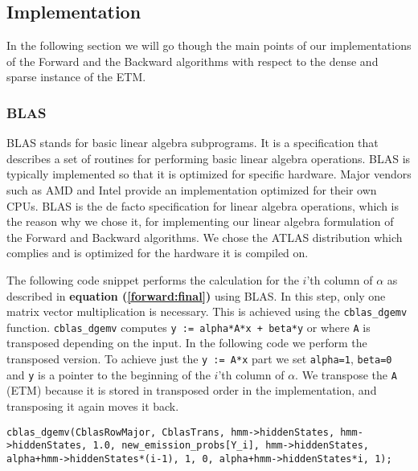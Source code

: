 \subsection{Implementation}\label{sec:impel}

In the following section we will go though the main points of our implementations of the Forward and the Backward algorithms with respect to the dense and sparse instance of the ETM.

\subsubsection{BLAS}\label{sec:blas}
BLAS\cite{blackford2002updated} stands for basic linear algebra subprograms. It is a specification that describes a set of routines for performing basic linear algebra operations. BLAS is typically implemented so that it is optimized for specific hardware. Major vendors such as AMD\cite{amd} and Intel\cite{intel} provide an implementation optimized for their own CPUs. BLAS is the de facto specification for linear algebra operations, which is the reason why we chose it, for implementing our linear algebra formulation of the Forward and Backward algorithms. We chose the ATLAS\cite{ATLAS} distribution which complies and is optimized for the hardware it is compiled on.


The following code snippet performs the calculation for the $i$'th column of $\alpha$ as described in \textbf{equation (\ref{forward:final})} using BLAS. In this step, only one matrix vector multiplication is necessary. This is achieved using the \texttt{cblas\_dgemv} function. \texttt{cblas\_dgemv} computes \texttt{y := alpha*A*x + beta*y} or where \texttt{A} is transposed depending on the input. In the following code we perform the transposed version.  To achieve just the \texttt{y := A*x} part we set \texttt{alpha=1}, \texttt{beta=0} and \texttt{y} is a pointer to the beginning of the $i$'th column of $\alpha$. We transpose the \texttt{A} (ETM) because it is stored in transposed order in the implementation, and transposing it again moves it back.


\begin{lstlisting}[style=CStyle]
cblas_dgemv(CblasRowMajor, CblasTrans, hmm->hiddenStates, hmm->hiddenStates, 1.0, new_emission_probs[Y_i], hmm->hiddenStates, alpha+hmm->hiddenStates*(i-1), 1, 0, alpha+hmm->hiddenStates*i, 1);
\end{lstlisting}


